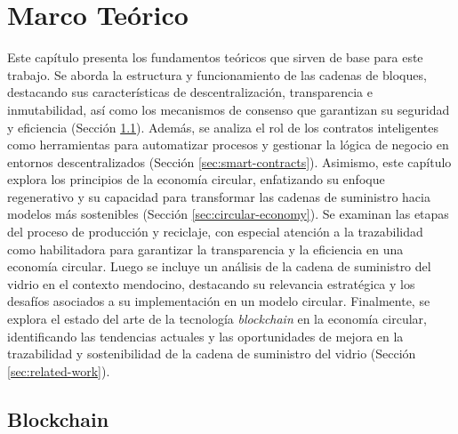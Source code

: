 \chapter[Marco Teórico]{Marco Teórico}
\label{cp:theoretical-framework}

\parindent0pt

Este capítulo presenta los fundamentos teóricos que sirven de base para este trabajo. Se aborda la estructura y funcionamiento de las cadenas de bloques, destacando sus características de descentralización, transparencia e inmutabilidad, así como los mecanismos de consenso que garantizan su seguridad y eficiencia (Sección \ref{sec:blockchain}). Además, se analiza el rol de los contratos inteligentes como herramientas para automatizar procesos y gestionar la lógica de negocio en entornos descentralizados (Sección \ref{sec:smart-contracts}). Asimismo, este capítulo explora los principios de la economía circular, enfatizando su enfoque regenerativo y su capacidad para transformar las cadenas de suministro hacia modelos más sostenibles (Sección \ref{sec:circular-economy}). Se examinan las etapas del proceso de producción y reciclaje, con especial atención a la \gls{trazabilidad} como habilitadora para garantizar la transparencia y la eficiencia en una economía circular. Luego se incluye un análisis de la cadena de suministro del vidrio en el contexto mendocino, destacando su relevancia estratégica y los desafíos asociados a su implementación en un modelo circular. Finalmente, se explora el estado del arte de la tecnología \textit{blockchain} en la economía circular, identificando las tendencias actuales y las oportunidades de mejora en la trazabilidad y \gls{sostenibilidad} de la cadena de suministro del vidrio (Sección \ref{sec:related-work}).

\section{Blockchain}
\label{sec:blockchain}

